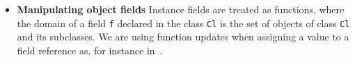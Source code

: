 \begin{itemize}
\item \textbf{Manipulating object fields}
Instance fields are treated as functions, where the domain of a field \texttt{f} 
declared in the class \texttt{Cl} is the set of objects of class \texttt{Cl} and its subclasses.
We are using function updates when assigning a value to a field reference as, for instance in~\cite{B00ppp}.





\end{itemize}
